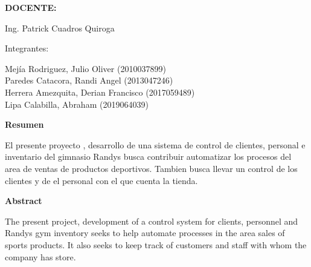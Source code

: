 \documentclass[12pt,letterpaper]{article}
\begin{document}
\begin{titlepage}
\begin{center}
\vspace*{0.3in}
\begin{Large}
\textbf{DOCENTE:} \\
\end{Large}

\vspace*{0.1in}
\begin{large}
Ing. Patrick Cuadros Quiroga\\
\end{large}

\vspace*{0.2in}
\vspace*{0.1in}
\begin{large}
Integrantes: \\
\begin{flushleft}

Mej\'ia Rodriguez, Julio Oliver         	\hfill	(2010037899) \\
Paredes Catacora, Randi Angel   	\hfill	(2013047246) \\
Herrera Amezquita, Derian Francisco		\hfill	(2017059489) \\
Lipa Calabilla, Abraham		\hfill	(2019064039) \\

\end{flushleft}
\end{large}
\end{center}

\end{titlepage}



\tableofcontents %
\thispagestyle{empty} %
\newpage
\setcounter{page}{1} %


\begin{center}
    \textbf{\Large Resumen}  
\end{center}

El presente proyecto , desarrollo de una sistema de control de clientes, personal e
inventario del gimnasio Randys busca  contribuir automatizar los procesos del area 
de ventas de productos deportivos.
Tambien busca llevar un control de los clientes y de el personal con el que cuenta la 
tienda. 
\\
\begin{center}
    \textbf{\Large Abstract}
\end{center}

The present project, development of a control system for clients, personnel and
Randys gym inventory seeks to help automate processes in the area
sales of sports products.
It also seeks to keep track of customers and staff with whom the company has
store.
\end{document}
